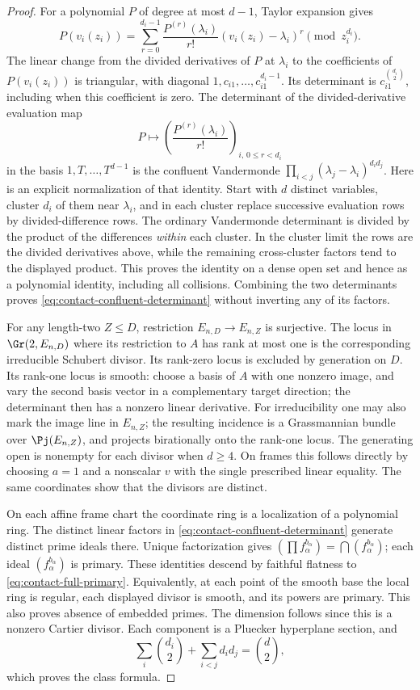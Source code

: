\begin{proof}
For a polynomial $P$ of degree at most $d-1$, Taylor expansion gives
\[
 P(v_i(z_i))=\sum_{r=0}^{d_i-1}
             \frac{P^{(r)}(\lambda_i)}{r!}
                    (v_i(z_i)-\lambda_i)^r\pmod {z_i^{d_i}}.
\]
The linear change from the divided derivatives of $P$ at $\lambda_i$
to the coefficients of $P(v_i(z_i))$ is triangular, with diagonal
$1,c_{i1},\ldots,c_{i1}^{d_i-1}$. Its determinant is
$c_{i1}^{\binom{d_i}{2}}$, including when this coefficient is zero.
The determinant of the divided-derivative evaluation map
\[
 P\longmapsto\left(\frac{P^{(r)}(\lambda_i)}{r!}\right)_{i,\,0\le r<d_i}
\]
in the basis $1,T,\ldots,T^{d-1}$ is the confluent Vandermonde
$\prod_{i<j}(\lambda_j-\lambda_i)^{d_i d_j}$. Here is an explicit
normalization of that identity. Start with $d$ distinct variables,
cluster $d_i$ of them near $\lambda_i$, and in each cluster replace
successive evaluation rows by divided-difference rows. The ordinary
Vandermonde determinant is divided by the product of the differences
\emph{within} each cluster. In the cluster limit the rows are the
divided derivatives above, while the remaining cross-cluster
factors tend to the displayed product. This proves the identity on
a dense open set and hence as a polynomial identity, including all
collisions. Combining the two determinants proves
\eqref{eq:contact-confluent-determinant} without inverting any of
its factors.

For any length-two $Z\le D$, restriction $E_{n,D}\to E_{n,Z}$ is
surjective. The locus in $\Gr(2,E_{n,D})$ where its restriction to
$A$ has rank at most one is the corresponding irreducible Schubert
divisor. Its rank-zero locus is excluded by generation on $D$.
Its rank-one locus is smooth: choose a basis of $A$ with one nonzero
image, and vary the second basis vector in a complementary target
direction; the determinant then has a nonzero linear derivative.
For irreducibility one may also mark the image line in $E_{n,Z}$;
the resulting incidence is a Grassmannian bundle over $\Pj(E_{n,Z})$,
and projects birationally onto the rank-one locus. The generating
open is nonempty for each divisor when $d\ge4$. On frames this
follows directly by choosing $a=1$ and a nonscalar $v$ with the
single prescribed linear equality. The same coordinates show that
the divisors are distinct.

On each affine frame chart the coordinate ring is a localization of
a polynomial ring. The distinct linear factors in
\eqref{eq:contact-confluent-determinant} generate distinct prime
ideals there. Unique factorization gives
$(\prod f_\alpha^{b_\alpha})=\bigcap(f_\alpha^{b_\alpha})$;
each ideal $(f_\alpha^{b_\alpha})$ is primary. These identities
descend by faithful flatness to \eqref{eq:contact-full-primary}.
Equivalently, at each point of the smooth base the local ring is
regular, each displayed divisor is smooth, and its powers are
primary. This also proves absence of embedded primes. The dimension
follows since this is a nonzero Cartier divisor. Each component is
a Pluecker hyperplane section, and
\[
 \sum_i\binom{d_i}{2}+\sum_{i<j}d_i d_j=\binom d2,
\]
which proves the class formula.


\end{proof}
